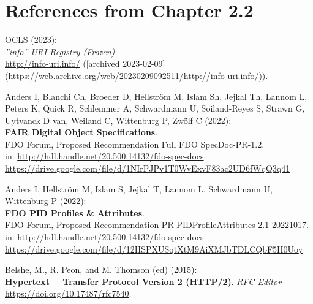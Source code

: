 
\section{References from Chapter 2.2}

\begin{thebibliography}{9}
   
OCLS (2023):\\
\emph{”info” URI Registry (Frozen)}\\
\url{http://info-uri.info/} ([archived 2023-02-09](https://web.archive.org/web/20230209092511/http://info-uri.info/)).

Anders I, Blanchi Ch, Broeder D, Hellström M, Islam Sh, Jejkal Th, Lannom L, Peters K, Quick R, Schlemmer A, Schwardmann U, Soiland-Reyes S, Strawn G, Uytvanck D van, Weiland C, Wittenburg P, Zwölf C (2022):\\
\textbf{FAIR Digital Object Specifications}.\\
FDO Forum, Proposed Recommendation Full FDO SpecDoc-PR-1.2. \\
in: \url{http://hdl.handle.net/20.500.14132/fdo-spec-docs}\\
\url{https://drive.google.com/file/d/1NIrPJPv1T0WvExvF83ac2UD6fWqQ3q41}

Anders I, Hellström M, Islam S, Jejkal T, Lannom L, Schwardmann U, Wittenburg P (2022):\\
\textbf{FDO PID Profiles \& Attributes}.\\
FDO Forum,  Proposed Recommendation PR-PIDProfileAttributes-2.1-20221017.
in: \url{http://hdl.handle.net/20.500.14132/fdo-spec-docs}\\
\url{https://drive.google.com/file/d/12HSPXUSqtXtM9AiXMJbTDLCQbF5H0Uoy}


Belshe, M., R. Peon, and M. Thomson (ed) (2015):\\
\textbf{Hypertext ––Transfer Protocol Version 2 (HTTP/2)}. 
\emph{RFC Editor}
\url{https://doi.org/10.17487/rfc7540}.


\end{thebibliography}
